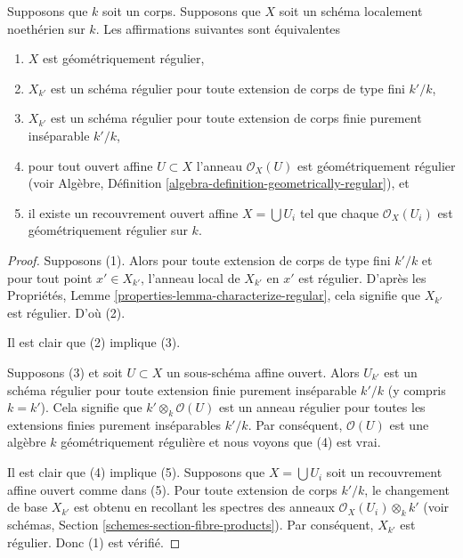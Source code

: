 \begin{lemma}
\label{lemma-geometrically-regular}
Supposons que $k$ soit un corps. Supposons que
$X$ soit un schéma localement noethérien sur
$k$. Les affirmations suivantes sont équivalentes
\begin{enumerate}
\item $X$ est géométriquement régulier, \item $X_{k'}$
est un schéma régulier pour toute extension de corps
de type fini $k'/k$, \item $X_{k'}$ est un schéma
régulier pour toute extension de corps finie purement
inséparable $k'/k$, \item pour tout ouvert affine $U
\subset X$ l'anneau $\mathcal{O}_X(U)$ est
géométriquement régulier (voir Algèbre, Définition
\ref{algebra-definition-geometrically-regular}), et \item il
existe un recouvrement ouvert affine $X = \bigcup U_i$ tel que
chaque $\mathcal{O}_X(U_i)$ est géométriquement régulier sur $k$.
\end{enumerate}
\end{lemma}

\begin{proof}
Supposons (1). Alors pour toute extension de corps de
type fini $k'/k$ et pour tout point $x' \in X_{k'}$,
l'anneau local de $X_{k'}$ en $x'$ est régulier. D'après
les Propriétés, Lemme
\ref{properties-lemma-characterize-regular}, cela signifie que $X_{k'}$ est régulier. D'où (2).

\medskip\noindent
Il est clair que (2) implique (3).

\medskip\noindent
Supposons (3) et soit $U \subset X$ un sous-schéma affine
ouvert. Alors $U_{k'}$ est un schéma régulier pour toute
extension finie purement inséparable $k'/k$ (y compris $k =
k'$). Cela signifie que $k' \otimes_k \mathcal{O}(U)$ est un
anneau régulier pour toutes les extensions finies purement
inséparables $k'/k$. Par conséquent, $\mathcal{O}(U)$ est une
algèbre $k$ géométriquement régulière et nous voyons que (4) est vrai.

\medskip\noindent
Il est clair que (4) implique (5). Supposons que $X = \bigcup
U_i$ soit un recouvrement affine ouvert comme dans (5). Pour toute
extension de corps $k'/k$, le changement de base $X_{k'}$ est
obtenu en recollant les spectres des anneaux $\mathcal{O}_X(U_i)
\otimes_k k'$ (voir schémas, Section
\ref{schemes-section-fibre-products}). Par conséquent, $X_{k'}$ est régulier. Donc (1) est vérifié.
\end{proof}

